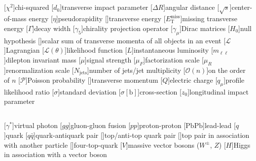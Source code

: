 \documentclass[thesis.tex]{subfiles}
\begin{document}
\begin{abbrev}

\subsection*{}
\begin{acronym}
[\ensuremath{\chi^2}\xspace]{chi-squared}
[\ensuremath{d_0}\xspace]{transverse impact parameter}
[\ensuremath{\Delta R}\xspace]{angular distance}
[\ensuremath{\sqrt{s}}\xspace]{center-of-mass energy}
[\ensuremath{\eta}\xspace]{pseudorapidity}
[\ET]{transverse energy}
[\ensuremath{E_\mathrm{T}^\mathrm{miss}}\xspace]{missing transverse energy}
[\ensuremath{\Gamma}\xspace]{decay width}
[\ensuremath{\gamma_5}\xspace]{chirality projection operator}
[\ensuremath{\gamma_\mu}\xspace]{Dirac matrices}
[\ensuremath{H_0}\xspace]{null hypothesis}
[\HT]{scalar sum of transverse momenta \pT of all objects in an event}
[\ensuremath{\mathcal{L}}\xspace]{Lagrangian}
[\ensuremath{\mathcal{L}(\theta)}\xspace]{likelihood function}
[$L$]{instantaneous luminosity}
[\ensuremath{m_{\ell\ell}}\xspace]{dilepton invariant mass}
[\ensuremath{\mu}\xspace]{signal strength}
[\ensuremath{\mu_F}\xspace]{factorization scale}
[\ensuremath{\mu_R}\xspace]{renormalization scale}
[\ensuremath{N_\mathrm{jets}}\xspace]{number of jets/jet multiplicity}
[\ensuremath{\mathcal{O}(n)}\xspace]{on the order of $n$}
[\ensuremath{\mathcal{P}}\xspace]{Poisson probability}
[\pT]{transverse momentum}
[\ensuremath{Q}\xspace]{electric charge}
[\ensuremath{q_\mu}\xspace]{profile likelihood ratio}
[\ensuremath{\sigma}\xspace]{standard deviation}
[\ensuremath{\sigma\mathrm{[b]}}\xspace]{cross-section}
[\ensuremath{z_0}\xspace]{longitudinal impact parameter}
\end{acronym}

\subsection*{}
\begin{acronym}
[\ensuremath{\gamma^*}\xspace]{virtual photon}
[\ensuremath{gg}\xspace]{gluon-gluon fusion}
[\ensuremath{pp}\xspace]{proton-proton}
[\ensuremath{\mathrm{PbPb}}\xspace]{lead-lead}
[\ensuremath{q}\xspace]{quark}
[\ensuremath{q\bar{q}}\xspace]{quark-antiquark pair}
[\ttbar]{top/anti-top quark pair}
[\ttX]{top pair in association with another particle}
[\tttt]{four-top-quark}
[\ensuremath{V}\xspace]{massive vector bosons ($W^\pm$, $Z$)}
[\ensuremath{H}\xspace]{Higgs in association with a vector boson}
\end{acronym}


\end{abbrev}
\end{document}

